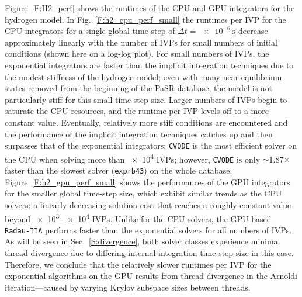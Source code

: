\documentclass[preprint,review,11pt]{elsarticle}
\begin{document}
Figure~\ref{F:H2_perf} shows the runtimes of the CPU and GPU integrators for the hydrogen model.
In Fig.~\ref{F:h2_cpu_perf_small} the runtimes per IVP for the CPU integrators for a single global time-step of $\Delta t= \SI{e-6}{\second}$ decrease approximately linearly with the number of IVPs for small numbers of initial conditions (shown here on a log-log plot).
For small numbers of IVPs, the exponential integrators are faster than the implicit integration techniques due to the modest stiffness of the hydrogen model; even with many near-equilibrium states removed from the beginning of the PaSR database, the model is not particularly stiff for this small time-step size.
Larger numbers of IVPs begin to saturate the CPU resources, and the runtime per IVP levels off to a more constant value.
Eventually, relatively more stiff conditions are encountered and the performance of the implicit integration techniques catches up and then surpasses that of the exponential integrators; \texttt{CVODE} is the most efficient solver on the CPU when solving more than \num{e4} IVPs; however, \texttt{CVODE} is only $\sim$\num{1.87}$\times$ faster than the slowest solver (\texttt{exprb43}) on the whole database.
Figure~\ref{F:h2_gpu_perf_small} shows the performances of the GPU integrators for the smaller global time-step size, which exhibit similar trends as the CPU solvers: a linearly decreasing solution cost that reaches a roughly constant value beyond \numrange{e3}{e4} IVPs.
Unlike for the CPU solvers, the GPU-based \texttt{Radau-IIA} performs faster than the exponential solvers for all numbers of IVPs.
As will be seen in Sec.~\ref{S:divergence}, both solver classes experience minimal thread divergence due to differing internal integration time-step size in this case.
Therefore, we conclude that the relatively slower runtimes per IVP for the exponential algorithms on the GPU results from thread divergence in the Arnoldi iteration---caused by varying Krylov subspace sizes between threads.
\end{document}

